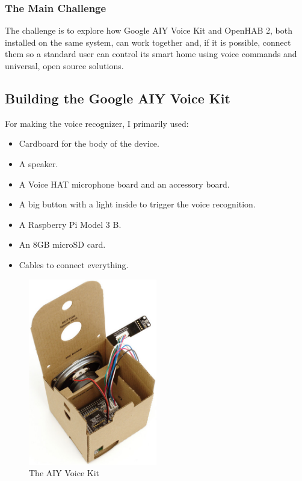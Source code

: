 \subsubsection{The Main Challenge}
The challenge is to explore how Google AIY Voice Kit and OpenHAB 2, both installed on the same system, can work together and, 
if it is possible, connect them so a standard user can control its smart home using voice commands and universal, open source solutions.

\subsection{Building the Google AIY Voice Kit}
For making the voice recognizer, I primarily used:

\begin{itemize}
	\item Cardboard for the body of the device.
	\item A speaker.
	\item A Voice HAT microphone board and an accessory board.
	\item A big button with a light inside to trigger the voice recognition.
	\item A Raspberry Pi Model 3 B.
	\item An 8GB microSD card.
	\item Cables to connect everything.
\end{itemize}

\begin{figure}
	\centering
	\includegraphics[width=0.5\textwidth]{images/Chapter_06/aiy-voice-kit.jpeg}
	\caption{The AIY Voice Kit}
	\label{fig:aiy-voice-kit}
\end{figure}


